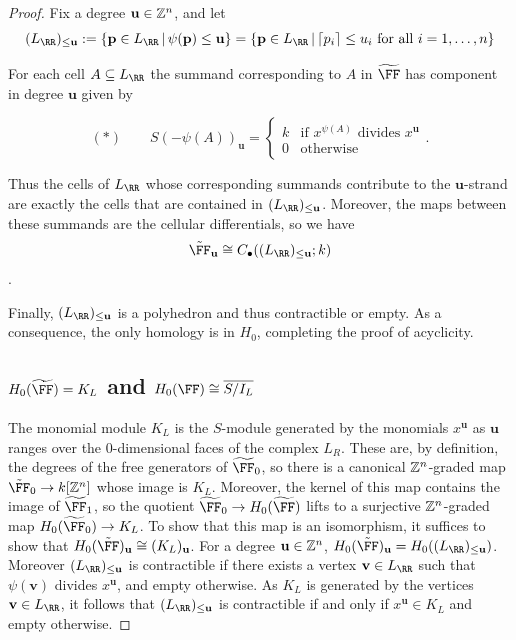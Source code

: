 \documentclass{amsart}
\begin{document}
\begin{proof}
Fix a degree $\mathbf{u}\in \mathbb Z^n$, and let
 \[(L_{\RR})_{\leq \mathbf{u}}:= \{\mathbf{p}\in L_{\RR} \,|\, \psi(\mathbf{p})\leq \mathbf{u}\} = \{\mathbf{p}\in L_{\RR} \,|\, \lceil p_i\rceil \leq u_i\text{ for all } i=1,\ldots,n\}\]

For each cell $A\subseteq L_{\RR}$ the summand corresponding to $A$ in $\tF$ has component in degree $\mathbf{u}$ given by

 \[  (*)\qquad S(-\psi(A))_{\mathbf{u}} =
  \begin{cases}
    k & \text{if }x^{\psi(A)}\text{ divides } x^{\mathbf{u}}\\
    0 & \text{otherwise}
  \end{cases}.\]

Thus the cells of $L_{\RR}$ whose corresponding summands contribute to the $\mathbf u$-strand are exactly the cells that are contained in $(L_{\RR})_{\leq \mathbf{u}}$. Moreover, the maps between these summands are the cellular differentials, so we have
  \[\tilde \FF_{\mathbf{u}} \cong C_\bullet((L_{\RR})_{\leq \mathbf{u}};k)\].
  
 Finally, $(L_{\RR})_{\leq \mathbf{u}}$ is a polyhedron and thus contractible or empty. As a consequence, the only homology is in $H_0$, completing the proof of acyclicity.

\subsection{\texorpdfstring{$\HH_0(\tF)= K_L$ and $\HH_0(\FF) \cong \overline{S/I_L}$}{H0 of the HHL complexes}}
The monomial module $K_L$ is the $S$-module
generated by the monomials $x^{\mathbf u}$ as $\mathbf u$ ranges
over the 0-dimensional faces of the complex $L_R$. These are, by definition, the degrees
of the free generators of $\tF_0$, so there is a  canonical $\mathbb Z^n$-graded map $\tilde \FF_0\rightarrow k[\ZZ^n]$ whose image is $K_L$.
Moreover, the kernel of this map contains the image of $\tF_1$, so the quotient $\tF_0\rightarrow H_0(\tF)$ lifts to a surjective $\mathbb Z^n$-graded map $H_0(\tF_0) \rightarrow K_L$. To show that this map is an isomorphism, it suffices to show that $H_0(\tilde \FF)_{\mathbf{u}}\cong (K_L)_{\mathbf{u}}$. 
For a degree $\mathbf{u}\in \mathbb Z^n$,
  $H_0(\tilde \FF)_{\mathbf{u}}=H_0((L_{\RR})_{\leq \mathbf{u}})$. Moreover $(L_{\RR})_{\leq \mathbf{u}}$ is contractible if there exists a vertex $\mathbf{v}\in L_{\RR}$ such that $\psi(\mathbf{v})$ divides $x^{\mathbf{u}}$, and empty otherwise. As $K_L$ is generated by the vertices $\mathbf{v}\in L_{\RR}$, it follows that $(L_{\RR})_{\leq \mathbf{u}}$ is contractible if and only if $x^{\mathbf{u}}\in K_L$ and empty otherwise.


\end{proof}
\end{document}
